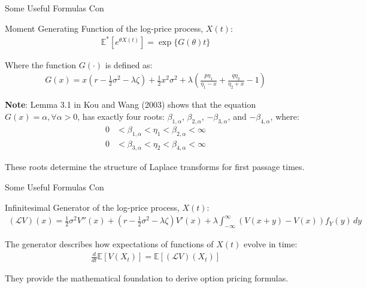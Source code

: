 \documentclass{beamer}
\begin{document}
\begin{frame}{Some Useful Formulas Con}

    {\footnotesize \footnotesize
    \par Moment Generating Function of the log-price process, \( X(t) \):
    \begin{align*}
        \mathbb{E}^* \left[ e^{\theta X(t)} \right] = \exp\{G(\theta)t\}
    \end{align*}
    \par Where the function $G(\cdot)$ is defined as:
    \begin{align*}
        G(x) = x \left( r - \frac{1}{2} \sigma^2 - \lambda \zeta \right) + \frac{1}{2} x^2 \sigma^2 
        + \lambda \left( \frac{p \eta_1}{\eta_1 - x} + \frac{q \eta_2}{\eta_2 + x} - 1 \right)
    \end{align*}
    \par  \pause \textbf{Note}: Lemma 3.1 in Kou and Wang (2003) shows that the 
    equation \( G(x) = \alpha, \forall \alpha > 0 \), has exactly 
    four roots: \(\beta_{1,\alpha}\), \(\beta_{2,\alpha}\), \(-\beta_{3,\alpha}\), and \(-\beta_{4,\alpha}\), where: 
    \begin{align*}
        0 &< \beta_{1,\alpha} < \eta_1 < \beta_{2,\alpha} < \infty\\
        0 &< \beta_{3,\alpha} < \eta_2 < \beta_{4,\alpha} < \infty
    \end{align*}
    \par These roots determine the structure of Laplace transforms for first passage times.
    }
    
\end{frame}
\begin{frame}{Some Useful Formulas Con}

    {\footnotesize \footnotesize
    \par Infinitesimal Generator of the log-price process, \( X(t) \):
    \vspace{1em}
    \begin{align*}
        (\mathcal{L}V)(x) = \frac{1}{2}\sigma^2 V''(x) + \left(r - \frac{1}{2}\sigma^2 
        - \lambda\zeta\right)V'(x) + \lambda \int_{-\infty}^{\infty}\left(V(x+y) - V(x)\right)f_Y(y)\,dy
    \end{align*}
    \vspace{1em}
    \par \pause  The generator describes how expectations of functions of \( X(t) \) evolve in time:
    \vspace{1em}
    \begin{align*}
        \frac{d}{dt}\mathbb{E}[V(X_t)] = \mathbb{E}[(\mathcal{L}V)(X_t)]
    \end{align*}
    \vspace{1em}
    \par They provide the mathematical foundation to derive option pricing formulas.



    }
    
\end{frame}
\end{document}
